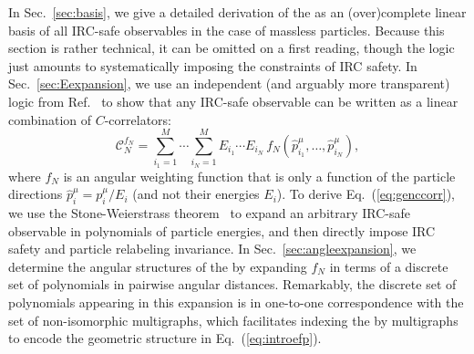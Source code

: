 \documentclass[letterpaper,11pt]{article}
\DeclareRobustCommand{\Sec}[1]{Sec.~\ref{#1}}
\DeclareRobustCommand{\Eq}[1]{Eq.~(\ref{#1})}
\DeclareRobustCommand{\Ref}[1]{Ref.~\cite{#1}}
\newcommand{\Bs}{\text{EFPs}\xspace}
\begin{document}
In \Sec{sec:basis}, we give a detailed derivation of the \Bs as an (over)complete linear basis of all IRC-safe observables in the case of massless particles.
%
Because this section is rather technical, it can be omitted on a first reading, though the logic just amounts to systematically imposing the constraints of IRC safety.
%
In \Sec{sec:Eexpansion}, we use an independent (and arguably more transparent) logic from \Ref{Tkachov:1995kk} to show that any IRC-safe observable can be written as a linear combination of $C$-correlators:
%
\begin{equation}\label{eq:genccorr}
\mathcal C_N^{f_N}=\sum_{i_1=1}^M \cdots\sum_{i_N=1}^M E_{i_1}\cdots E_{i_N} \, f_N(\hat p_{i_1}^\mu,\ldots,\hat p_{i_N}^\mu),
\end{equation}
%
where $f_N$ is an angular weighting function that is only a function of the particle directions $\hat{p}_i^\mu=p_i^\mu/E_i$ (and not their energies $E_i$).
%
To derive \Eq{eq:genccorr}, we use the Stone-Weierstrass theorem~\cite{stone1948generalized} to expand an arbitrary IRC-safe observable in polynomials of particle energies, and then directly impose IRC safety and particle relabeling invariance.
%
In \Sec{sec:angleexpansion}, we determine the angular structures of the \Bs by expanding $f_N$ in terms of a discrete set of polynomials in pairwise angular distances.
%
Remarkably, the discrete set of polynomials appearing in this expansion is in one-to-one correspondence with the set of non-isomorphic multigraphs, which facilitates indexing the \Bs by multigraphs to encode the geometric structure in \Eq{eq:introefp}.
\end{document}
